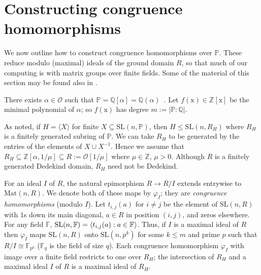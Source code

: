 \documentclass[11pt]{amsart}
\theoremstyle{definition}
\theoremstyle{remark}
\newcommand{\F}{\mathbb{F}}
\newcommand{\Z}{\mathbb{Z}}
\newcommand{\Q}{\mathbb{Q}}
\renewcommand{\P}{\mathbb{P}}
\newcommand{\SL}{\mathrm{SL}}
\begin{document}
\section{Constructing congruence homomorphisms} 
\label{CongHom}

We now outline how to construct congruence homomorphisms over $\P$. 
These reduce modulo (maximal) ideals of the ground domain $R$, so that
much of our computing is with matrix groups over finite fields.
Some of the material of this section may be found also in 
\cite[Section~3.2]{Recog}.

There exists $\alpha\in \mathcal{O}$ such that  
$\mathbb{P} =  \Q[\alpha] =  \Q(\alpha)$~\cite[p.~81]{Koch}.
Let $f(\mathrm{x})\in \Z[\mathrm{x}]$ be the minimal polynomial 
of $\alpha$; so $f(\mathrm{x})$ has degree $m:= |\P:\Q|$.  

As noted, if $H=\langle X\rangle$ for finite $X\subseteq \SL(n,\P)$, 
then $H\leq \SL(n,R_H)$ where $R_H$ is a finitely generated subring 
of $\P$. We can take $R_H$ to be generated by the entries of the 
elements of $X\cup X^{-1}$.  Hence we assume that $R_H\subseteq 
\allowbreak \Z[\alpha, 1/\mu] \subseteq \allowbreak R:=
\mathcal{O}[1/\mu]$ where $\mu\in \Z$, $\mu>0$. 
Although $R$ is a finitely generated Dedekind domain, 
$R_H$ need not be Dedekind. 

For an ideal $I$ of $R$, the natural epimorphism 
$R \rightarrow R/I$ extends entrywise to $\mathrm{Mat}(n,R)$. 
We denote both of these maps by $\varphi_{I}$; they are 
\emph{congruence homomorphisms} (modulo $I$).
Let $t_{i,j}(a)$ for $i\neq j$ be the 
element of $\SL(n,R)$ with $1$s down its main diagonal, $a\in R$ 
in position $(i,j)$, and zeros elsewhere.  
 For any field $\F$, $\SL(n,\F) = \langle
 t_{i,j}(a) : a\in \F\hspace{.5pt}\rangle$. 
Thus, if $I$ is a maximal ideal of $R$ then $\varphi_I$  maps 
$\SL(n, R)$ onto $\SL(n, p^k)$ for some $k \leq m$ and prime $p$ 
such that $R/I \cong \F_{p^k}$ ($\F_q$ is the field of size $q$).
Each congruence homomorphism $\varphi_I$ with image over a finite 
field restricts to one over $R_H$; the intersection of $R_H$ and 
a maximal ideal $I$ of $R$ is a maximal ideal of $R_H$. 
\end{document}
